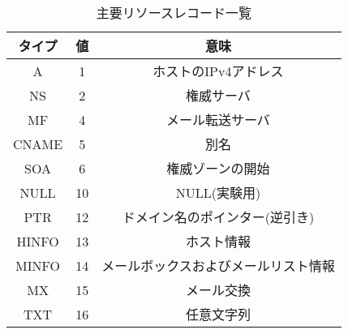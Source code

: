 \begin{table}[htb]
 \centering
  \begin{tabular}{ccc}
    \toprule
		\textbf{タイプ} & \textbf{値} & \textbf{意味} \\
    \midrule
    A & 1 &  ホストのIPv4アドレス \\
    NS & 2 & 権威サーバ \\
    MF & 4 & メール転送サーバ \\
    CNAME & 5 & 別名 \\
    SOA & 6 & 権威ゾーンの開始 \\
    NULL & 10 & NULL(実験用) \\
    PTR & 12 & ドメイン名のポインター(逆引き) \\
    HINFO & 13 & ホスト情報 \\
    MINFO & 14 & メールボックスおよびメールリスト情報 \\
    MX & 15 & メール交換 \\
    TXT & 16 & 任意文字列 \\
    \bottomrule
  \end{tabular}
 \caption{主要リソースレコード一覧}
 \label{tab:resource-record}
\end{table}
